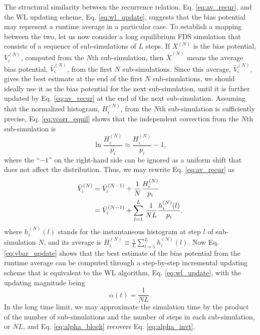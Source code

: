 \documentclass[reprint, superscriptaddress, floatfix]{revtex4-1}
\begin{document}
The structural similarity between the recurrence relation,
Eq. \eqref{eq:av_recur},
and the WL updating scheme, Eq. \eqref{eq:wl_update},
suggests that the bias potential may represent
a runtime average in a particular case.
%
To establish a mapping between the two,
let us now consider a long equilibrium FDS simulation
that consists of a sequence of sub-simulations
of $L$ steps.
%
If $X^{(N)}$ is
the bias potential, $V_i^{(N)}$, computed
from the $N$th sub-simulation,
then ${\bar X}^{(N)}$ means the average bias potential,
${\bar V}_i^{(N)}$,
from the first $N$ sub-simulations.
%
Since this average, ${\bar V}_i^{(N)}$,
gives the best estimate at the end of
the first $N$ sub-simulations,
we should ideally use it as the bias potential
for the next sub-simulation,
until it is further updated by Eq. \eqref{eq:av_recur}
at the end of the next sub-simulation.
%
Assuming that the normalized histogram, $H_i^{(N)}$,
from the $N$th sub-simulation is sufficiently precise,
Eq. \eqref{eq:vcorr_equil}
shows that the independent
correction from the $N$th sub-simulation is
%
\begin{equation*}
  \ln \frac{ H_i^{(N)} } { p_i }
  \approx
  \frac{ H_i^{(N)} } { p_i } - 1
  ,
\end{equation*}
%
where the ``$-1$'' on the right-hand side
can be ignored as a uniform shift
that does not affect the distribution.
%
Thus, we may rewrite Eq. \eqref{eq:av_recur} as
\begin{align}
  {\bar V}_i^{(N)}
  &=
  {\bar V}_i^{(N-1)}
  +
  \frac{1}{N} \frac{ H_i^{(N)} }{ p_i }
  \notag
  \\
  &=
  {\bar V}_i^{(N-1)}
  +
  \sum_{l=1}^L \frac{1}{N L} \frac{ h_i^{(N)}(l) }{ p_i }
  ,
  \label{eq:vbar_update}
\end{align}
%
where $h_i^{(N)}(l)$ stands for the instantaneous histogram
at step $l$ of sub-simulation $N$,
and its average is
$H_i^{(N)} \equiv \frac{1}{L} \sum_{l=1}^L h_i^{(N)}(l)$.
%
Now Eq. \eqref{eq:vbar_update} shows that the best estimate
of the bias potential from the runtime average can be computed
through a step-by-step incremental updating scheme that is equivalent to
the WL algorithm, Eq. \eqref{eq:wl_update},
with the updating magnitude being
%
\begin{equation}
  \alpha(t) = \frac{1}{N L}
  .
  \label{eq:alpha_block}
\end{equation}
%
In the long time limit,
we may approximate the simulation time
by the product of the number of sub-simulations
and the number of steps in each sub-simulation, or $N L$,
%
and Eq. \eqref{eq:alpha_block} recovers Eq. \eqref{eq:alpha_invt}.
\end{document}
